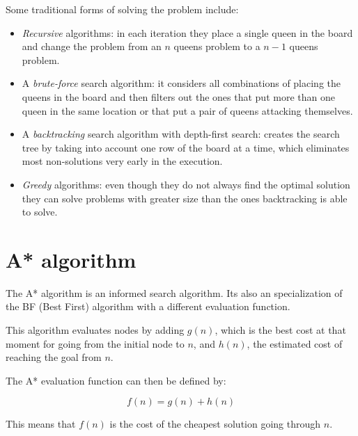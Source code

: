 \documentclass[]{llncs}
\begin{document}
Some traditional forms of solving the problem include:
\begin{itemize}
    \item \textit{Recursive} algorithms: in each iteration they place a single queen in the board and change the problem from an $n$ queens problem to a $n - 1$ queens problem.
    \item A \textit{brute-force} search algorithm: it considers all combinations of placing the queens in the board and then filters out the ones that put more than one queen in the same location or that put a pair of queens attacking themselves.
    \item A \textit{backtracking} search algorithm with depth-first search: creates the search tree by taking into account one row of the board at a time, which eliminates most non-solutions very early in the execution.
    \item \textit{Greedy} algorithms: even though they do not always find the optimal solution they can solve problems with greater size than the ones backtracking is able to solve.
\end{itemize}
\section{A* algorithm}\label{astar_alg}
The A* algorithm \cite{inteligencia-artificial,artificial-intelligence-1} is an informed search algorithm. Its also an specialization of the BF (Best First) algorithm with a different evaluation function. 

This algorithm evaluates nodes by adding $g(n)$, which is the best cost at that moment for going from the initial node to $n$, and $h(n)$, the estimated cost of reaching the goal from $n$.

The A* evaluation function can then be defined by:

\[f(n) = g(n) + h(n)\] 

This means that $f(n)$ is the cost of the cheapest solution going through $n$.
\end{document}
